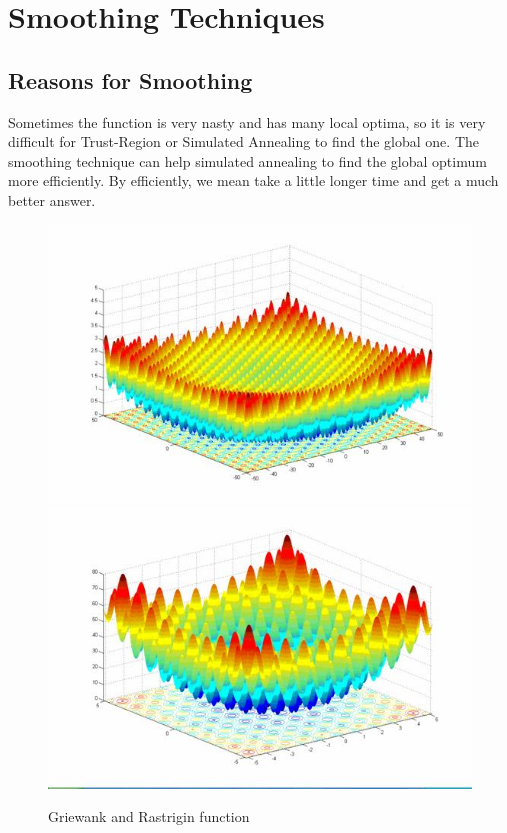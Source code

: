 \documentclass[letterpaper,12pt,titlepage,oneside,final]{book}
\begin{document}
\chapter{Smoothing Techniques}

\section{Reasons for Smoothing}

Sometimes the function is very nasty and has many local optima, so it is very difficult for Trust-Region or Simulated Annealing to find the global one. The smoothing technique can help simulated annealing to find the global optimum more efficiently. By efficiently, we mean take a little longer time and get a much better answer.

\begin{figure}[H]
\includegraphics[scale=0.55]{griewank.jpg}
\includegraphics[scale=0.55]{Rastrigin.jpg}
\caption{Griewank and Rastrigin function}
\end{figure}
\end{document}
